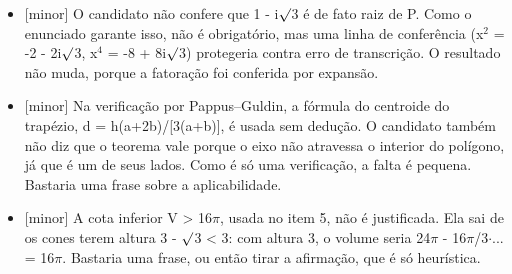 \documentclass{article}%
\begin{document}
\begin{itemize}%
\item%
{[}minor{]} O candidato não confere que 1 - i$\surd$3 é de fato raiz de P. Como o enunciado garante isso, não é obrigatório, mas uma linha de conferência (x$^2$ = -2 - 2i$\surd$3, x$^{4}$ = -8 + 8i$\surd$3) protegeria contra erro de transcrição. O resultado não muda, porque a fatoração foi conferida por expansão.%
\item%
{[}minor{]} Na verificação por Pappus--Guldin, a fórmula do centroide do trapézio, d = h(a+2b)/{[}3(a+b){]}, é usada sem dedução. O candidato também não diz que o teorema vale porque o eixo não atravessa o interior do polígono, já que é um de seus lados. Como é só uma verificação, a falta é pequena. Bastaria uma frase sobre a aplicabilidade.%
\item%
{[}minor{]} A cota inferior V > 16$\pi$, usada no item 5, não é justificada. Ela sai de os cones terem altura 3 - $\surd$3 < 3: com altura 3, o volume seria 24$\pi$ - 16$\pi$/3$\cdot$... = 16$\pi$. Bastaria uma frase, ou então tirar a afirmação, que é só heurística.%
\end{itemize}%
\end{document}
